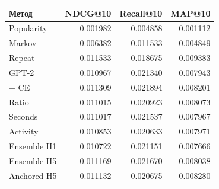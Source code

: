 \begin{tabular}{lrrr}\toprule
Метод & NDCG@10 & Recall@10 & MAP@10\\\midrule
Popularity & 0.001982 & 0.004858 & 0.001112 \\
Markov & 0.006382 & 0.011533 & 0.004849 \\
Repeat & 0.011533 & 0.018675 & 0.009383 \\
GPT-2 & 0.010967 & 0.021340 & 0.007943 \\
+ CE & 0.011309 & 0.021894 & 0.008201 \\
Ratio & 0.011015 & 0.020923 & 0.008073 \\
Seconds & 0.011017 & 0.021537 & 0.007967 \\
Activity & 0.010853 & 0.020633 & 0.007971 \\
Ensemble H1 & 0.010722 & 0.021151 & 0.007666 \\
Ensemble H5 & 0.011169 & 0.021670 & 0.008038 \\
Anchored H5 & 0.011132 & 0.020675 & 0.008280 \\
\bottomrule\end{tabular}
